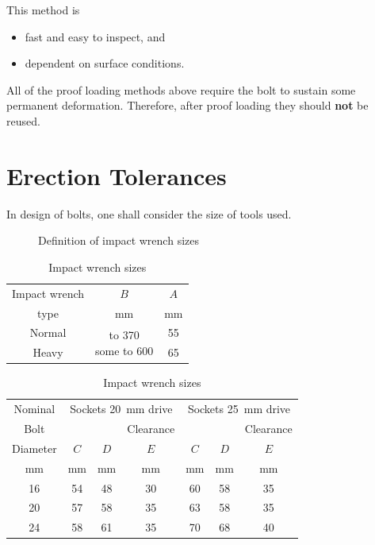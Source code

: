 \begin{enumerate}
\begin{figure}[H]
\end{figure}
This method is
\begin{itemize}
\item fast and easy to inspect, and
\item dependent on surface conditions.
\end{itemize}
\end{enumerate}
All of the proof loading methods above require the bolt to sustain some permanent deformation. Therefore, after proof loading they should \textbf{not} be reused.
\section{Erection Tolerances}
In design of bolts, one shall consider the size of tools used.
\begin{figure}[H]
\centering\caption{Definition of impact wrench sizes \citet{ASI2016}}
\end{figure}

\begin{table}[H]
\centering\caption{Impact wrench sizes \citet{ASI2016}}
\begin{tabular}{ccc}
	\toprule
	Impact wrench &                                $B$                                &   $A$    \\
	    type      &                             \si{\mm}                              & \si{\mm} \\ \midrule
	   Normal     & \multirow{2}[0]{*}{\parbox{5cm}{\centering{}to 370\\some to 600}} &    55    \\
	    Heavy     &                                                                   &    65    \\ \bottomrule
\end{tabular}
\end{table}
\begin{table}[H]
\centering\caption{Impact wrench sizes \citet{ASI2016}}
\begin{tabular}{ccccccc}
	\toprule
	Nominal  & \multicolumn{3}{c}{Sockets \SI{20}{\mm} drive} & \multicolumn{3}{c}{Sockets \SI{25}{\mm} drive} \\
	  Bolt   &          &          &        Clearance         &          &          &        Clearance         \\
	Diameter &   $C$    &   $D$    &           $E$            &   $C$    &   $D$    &           $E$            \\
	\si{\mm} & \si{\mm} & \si{\mm} &         \si{\mm}         & \si{\mm} & \si{\mm} &         \si{\mm}         \\ \midrule
	   16    &    54    &    48    &            30            &    60    &    58    &            35            \\
	   20    &    57    &    58    &            35            &    63    &    58    &            35            \\
	   24    &    58    &    61    &            35            &    70    &    68    &            40            \\ \bottomrule
\end{tabular}
\end{table}

